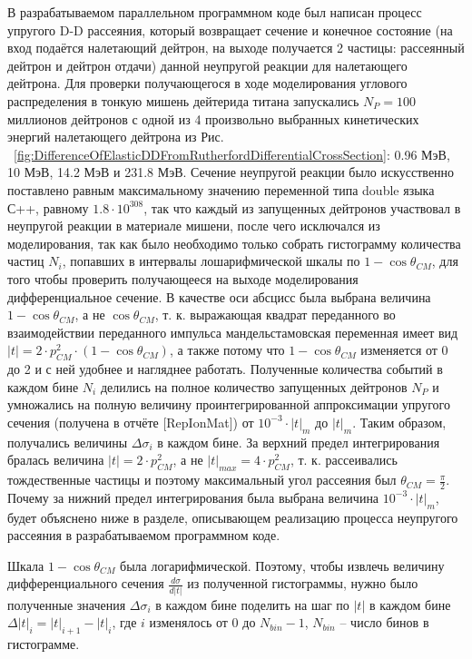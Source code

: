 \documentclass[a4paper,12pt]{article}
\begin{document}
\begin{large}
	В разрабатываемом параллельном программном коде был написан процесс упругого D-D рассеяния, который возвращает сечение и конечное состояние (на вход подаётся налетающий дейтрон, на выходе получается 2 частицы: рассеянный дейтрон и дейтрон отдачи) данной неупругой реакции для налетающего дейтрона.
	Для проверки получающегося в ходе моделирования углового распределения в тонкую мишень дейтерида титана запускались $N_P=100$ миллионов дейтронов с одной из 4 произвольно выбранных кинетических энергий налетающего дейтрона из Рис. ~\ref{fig:DifferenceOfElasticDDFromRutherfordDifferentialCrossSection}: 0.96 МэВ, 10 МэВ, 14.2 МэВ и 231.8 МэВ.
	Сечение неупругой реакции было искусственно поставлено равным максимальному значению переменной типа double языка С++, равному $1.8 \cdot 10^{308}$, так что каждый из запущенных дейтронов участвовал в неупругой реакции в материале мишени, после чего исключался из моделирования, так как было необходимо только собрать гистограмму количества частиц $N_i$, попавших в интервалы лошарифмической шкалы по $1-\cos{\theta_{CM}}$, для того чтобы проверить получающееся на выходе моделирования дифференциальное сечение.
	В качестве оси абсцисс была выбрана величина $1-\cos{\theta_{CM}}$, а не $\cos{\theta_{CM}}$, т. к. выражающая квадрат переданного во взаимодействии переданного импульса мандельстамовская переменная имеет вид $|t|=2\cdot p^2_{CM} \cdot \left( 1- \cos{\theta_{CM}} \right)$, а также потому что $1-\cos{\theta_{CM}}$ изменяется от 0 до 2 и с ней удобнее и нагляднее работать.
	Полученные количества событий в каждом бине $N_i$ делились на полное количество запущенных дейтронов $N_P$ и умножались на полную величину проинтегрированной аппроксимации упругого сечения (получена в отчёте [RepIonMat]) от $10^{-3} \cdot |t|_m$ до $|t|_m$.
	Таким образом, получались величины $\Delta \sigma_i$ в каждом бине.
	За верхний предел интегрирования бралась величина $|t|=2\cdot p^2_{CM}$, а не $|t|_{max}=4\cdot p^2_{CM}$, т. к. рассеивались тождественные частицы и поэтому максимальный угол рассеяния был $\theta_{CM}=\frac{\pi}{2}$.
	Почему за нижний предел интегрирования была выбрана величина $10^{-3} \cdot |t|_m$, будет объяснено ниже в разделе, описывающем реализацию процесса неупругого рассеяния в разрабатываемом программном коде.
	
	Шкала $1-\cos{\theta_{CM}}$ была логарифмической.
	Поэтому, чтобы извлечь величину дифференциального сечения $\frac{d\sigma}{d|t|}$ из полученной гистограммы, нужно было полученные значения $\Delta \sigma_i$ в каждом бине поделить на шаг по $|t|$ в каждом бине $\Delta |t|_i=|t|_{i+1}-|t|_i$, где $i$ изменялось от 0 до $N_{bin}-1$, $N_{bin}$ -- число бинов в гистограмме.
	

\end{large}
\end{document}
